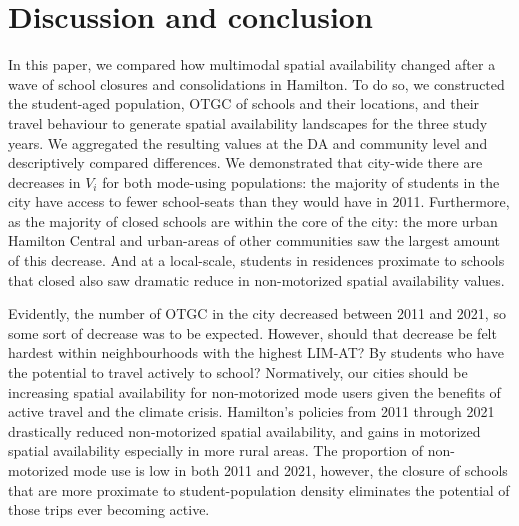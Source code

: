 \documentclass[
default
]{sn-jnl}
\begin{document}
\section{Discussion and conclusion}\label{discussion-and-conclusion}

In this paper, we compared how multimodal spatial availability changed
after a wave of school closures and consolidations in Hamilton. To do
so, we constructed the student-aged population, OTGC of schools and
their locations, and their travel behaviour to generate spatial
availability landscapes for the three study years. We aggregated the
resulting values at the DA and community level and descriptively
compared differences. We demonstrated that city-wide there are decreases
in \(V_i\) for both mode-using populations: the majority of students in
the city have access to fewer school-seats than they would have in 2011.
Furthermore, as the majority of closed schools are within the core of
the city: the more urban Hamilton Central and urban-areas of other
communities saw the largest amount of this decrease. And at a
local-scale, students in residences proximate to schools that closed
also saw dramatic reduce in non-motorized spatial availability values.

Evidently, the number of OTGC in the city decreased between 2011 and
2021, so some sort of decrease was to be expected. However, should that
decrease be felt hardest within neighbourhoods with the highest LIM-AT?
By students who have the potential to travel actively to school?
Normatively, our cities should be increasing spatial availability for
non-motorized mode users given the benefits of active travel and the
climate crisis. Hamilton's policies from 2011 through 2021 drastically
reduced non-motorized spatial availability, and gains in motorized
spatial availability especially in more rural areas. The proportion of
non-motorized mode use is low in both 2011 and 2021, however, the
closure of schools that are more proximate to student-population density
eliminates the potential of those trips ever becoming active.
\end{document}
